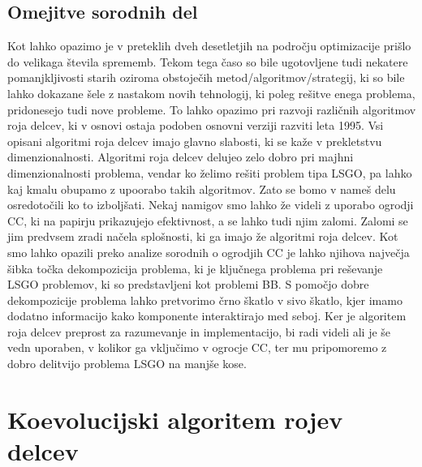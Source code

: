 \section{Omejitve sorodnih del}

Kot lahko opazimo je v preteklih dveh desetletjih na področju optimizacije prišlo do velikaga števila sprememb.
Tekom tega časo so bile ugotovljene tudi nekatere pomanjkljivosti starih oziroma obstoječih metod/algoritmov/strategij, ki so bile lahko dokazane šele z nastakom novih tehnologij, ki poleg rešitve enega problema, pridonesejo tudi nove probleme.
To lahko opazimo pri razvoji različnih algoritmov roja delcev, ki v osnovi ostaja podoben osnovni verziji razviti leta 1995.
Vsi opisani algoritmi roja delcev imajo glavno slabosti, ki se kaže v prekletstvu dimenzionalnosti.
Algoritmi roja delcev delujeo zelo dobro pri majhni dimenzionalnosti problema, vendar ko želimo rešiti problem tipa LSGO, pa lahko kaj kmalu obupamo z upoorabo takih algoritmov.
Zato se bomo v nameš delu osredotočili ko to izboljšati.
Nekaj namigov smo lahko že videli z uporabo ogrodji CC, ki na papirju prikazujejo efektivnost, a se lahko tudi njim zalomi.
Zalomi se jim predvsem zradi načela splošnosti, ki ga imajo že algoritmi roja delcev.
Kot smo lahko opazili preko analize sorodnih o ogrodjih CC je lahko njihova največja šibka točka dekompozicija problema, ki je ključnega problema pri reševanje LSGO problemov, ki so predstavljeni kot problemi BB.
S pomočjo dobre dekompozicije problema lahko pretvorimo črno škatlo v sivo škatlo, kjer imamo dodatno informacijo kako komponente interaktirajo med seboj.
Ker je algoritem roja delcev preprost za razumevanje in implementacijo, bi radi videli ali je še vedn uporaben, v kolikor ga vključimo v ogrocje CC, ter mu pripomoremo z dobro delitvijo problema LSGO na manjše kose.

\chapter{Koevolucijski algoritem rojev delcev}\label{chap:algo}


